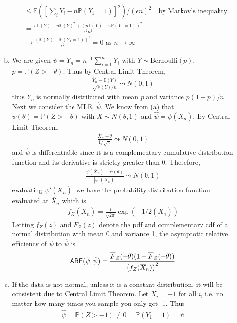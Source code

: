 \documentclass[a4paper,10pt]{article}
\theoremstyle{definition}
\begin{document}
\begin{enumerate}
\begin{enumerate}[(a)]
\begin{align*}
&\leq \mathbb{E}\left(\left[\sum_iY_i - n\mathbb{P}(Y_1=1)\right]^2\right)/(\epsilon n)^2\quad \text{by Markov's inequality}\\
&=\frac{n\mathbb{E}(Y)-n\mathbb{E}(Y)^2+\left(n\mathbb{E}(Y)-n\mathbb{P}(Y_1=1)\right)^2}{\epsilon^2n^2}\\
&\to \frac{(\mathbb{E}(Y)-\mathbb{P}(Y_1=1))^2}{\epsilon^2}=0 \text{ as } n \to \infty
\end{align*}
\item We are given $\tilde{\psi} = \overline{Y}_n = n^{-1}\sum_{i=1}^{n}Y_i$ with $Y \sim \text{Bernoulli}(p)$, $p = \mathbb{P}(Z>-\theta)$. Thus by Central Limit Theorem,
\begin{align*}
\frac{\overline{Y}_n-\mathbb{E}(Y)}{\sqrt{\mathbb{V}(Y)/n}} \leadsto N(0,1)
\end{align*}
thus $\overline{Y}_n$ is normally distributed with mean $p$ and variance $p(1-p)/n$. Next we consider the {\sffamily MLE}, $\hat{\psi}$. We know from (a) that $\psi(\theta) = \mathbb{P}(Z > -\theta)$ with $X \sim N(\theta, 1)$ and $\hat{\psi} = \psi(\overline{X}_n)$. By Central Limit Theorem,
\begin{align*}
\frac{\overline{X}_n - \theta}{1/\sqrt{n}} \leadsto N(0,1)
\end{align*}
and $\hat{\psi}$ is differentiable since it is a complementary cumulative distribution function and its derivative is strictly greater than 0. Therefore,
\begin{align*}
\frac{\psi(\overline{X}_n) - \psi(\theta)}{|\psi'(\overline{X}_n)|} \leadsto N(0, 1)
\end{align*}
evaluating $\psi'(\overline{X}_n)$, we have the probability distribution function evaluated at $\overline{X}_n$ which is 
\begin{align*}
f_X(\overline{X}_n)=\frac{1}{\sqrt{2\pi}} \exp( -1/2(\overline{X}_n))
\end{align*}
Letting $f_Z(z)$ and $\overline{F}_Z(z)$ denote the pdf and complementary cdf of a normal distribution with mean $0$ and variance 1, the asymptotic relative efficiency of $\tilde{\psi}$ to $\hat{\psi}$ is 
\begin{align*}
\text{\sffamily ARE}(\tilde{\psi}, \hat{\psi}) = \frac{\overline{F}_Z(-\theta)(1-\overline{F}_Z(-\theta))}{\left(f_Z(\overline{X}_n)\right)^2}
\end{align*}
\item If the data is not normal, unless it is a constant distribution, it will be consistent due to Central Limit Theorem. Let $X_i =-1$ for all $i$, i.e. no matter how many times you sample you only get -1. Thus 
\begin{align*}
\hat{\psi}= \mathbb{P}(Z > -1) \neq 0 = \mathbb{P}(Y_1=1) = \psi
\end{align*}
\end{enumerate}
\end{enumerate}
\end{document}
